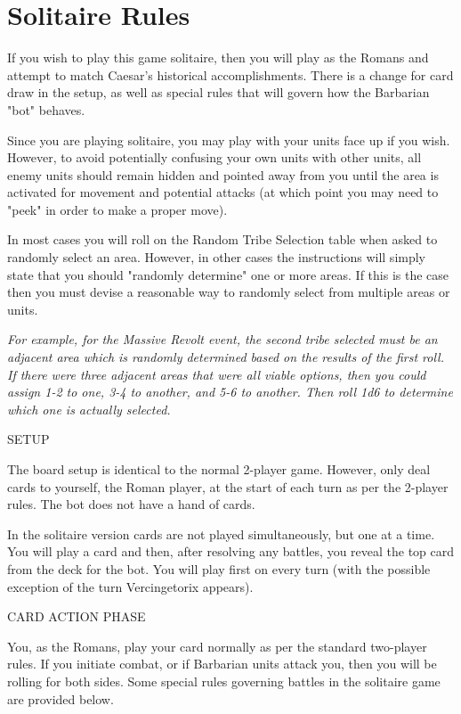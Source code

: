 \section{Solitaire Rules}

If you wish to play this game solitaire, then you will play as the Romans and attempt to match Caesar's historical accomplishments. There is a change for card draw in the setup, as well as special rules that will govern how the Barbarian "bot" behaves.

Since you are playing solitaire, you may play with your units face up if you wish. However, to avoid potentially confusing your own units with other units, all enemy units should remain hidden and pointed away from you until the area is activated for movement and potential attacks (at which point you may need to "peek" in order to make a proper move).

In most cases you will roll on the Random Tribe Selection table when asked to randomly select an area. However, in other cases the instructions will simply state that you should "randomly determine" one or more areas. If this is the case then you must devise a reasonable way to randomly select from multiple areas or units.

\textit{For example, for the Massive Revolt event, the second tribe selected must be an adjacent area which is randomly determined based on the results of the first roll. If there were three adjacent areas that were all viable options, then you could assign 1-2 to one, 3-4 to another, and 5-6 to another. Then roll 1d6 to determine which one is actually selected.}

SETUP

The board setup is identical to the normal 2-player game. However, only deal cards to yourself, the Roman player, at the start of each turn as per the 2-player rules. The bot does not have a hand of cards.

In the solitaire version cards are not played simultaneously, but one at a time. You will play a card and then, after resolving any battles, you reveal the top card from the deck for the bot. You will play first on every turn (with the possible exception of the turn Vercingetorix appears).

CARD ACTION PHASE

You, as the Romans, play your card normally as per the standard two-player rules. If you initiate combat, or if Barbarian units attack you, then you will be rolling for both sides. Some special rules governing battles in the solitaire game are provided below.

